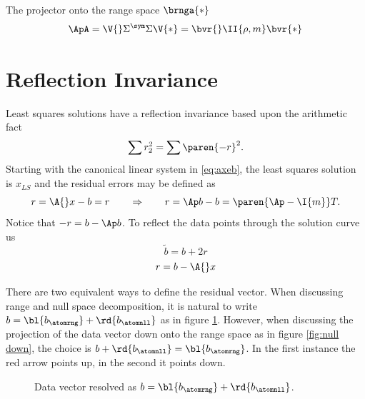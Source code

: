 The projector onto the range space $\brnga{*}$
  \begin{equation*}   %
      \ApA = \V{}\Sigma^{\sym}\Sigma{}\V{*} = \bvr{} \II{\rho,m} \bvr{*}
  \end{equation*}

\section{\label{sec:reflection invariance}Reflection Invariance}  %
Least squares solutions have a reflection invariance based upon the arithmetic fact 
  \begin{equation*}   %
    \sum r_{2}^{2} = \sum \paren{-r}^{2}.
  \end{equation*}
Starting with the canonical linear system in \eqref{eq:axeb}, the least squares solution is $x_{LS}$ and the residual errors may be defined as
  \begin{equation*}   %
    r = \A{}x - b = r \qquad \Rightarrow \qquad r = \Ap b - b = \paren{\Ap - \I{m}}T.
  \end{equation*}
Notice that $-r = b - \Ap b$. To reflect the data points through the solution curve us
  \begin{equation*}   %
    \tilde{b} = b + 2r
  \end{equation*}
  \begin{equation*}   %
      r = b - \A{}x 
  \end{equation*}

There are two equivalent ways to define the residual vector. When discussing range and null space decomposition, it is natural to write $b = \bl{b_{\atomrng}} +  \rd{b_{\atomnll}}$ as in figure \ref{fig:null up}. However, when discussing the projection of the data vector down onto the range space as in figure \ref{fig:null down}, the choice is $b +  \rd{b_{\atomnll}} = \bl{b_{\atomrng}}$. In the first instance the red arrow points up, in the second it points down.
\begin{figure}[htbp] %
   \centering
   \caption{Data vector resolved as $b = \bl{b_{\atomrng}} +  \rd{b_{\atomnll}}$.}
   \label{fig:null up}
\end{figure}

